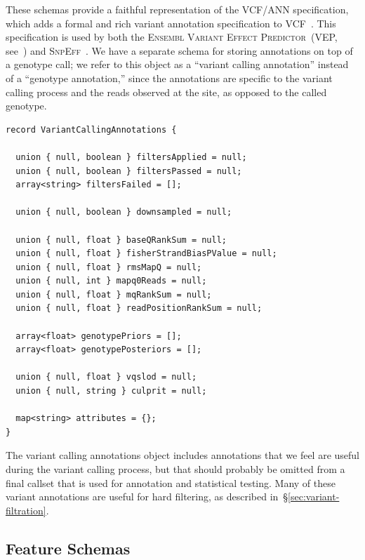 \documentclass[phd]{ucbthesis}
\begin{document}
These schemas provide a faithful representation of the VCF/ANN specification,
which adds a formal and rich variant annotation specification to
VCF~\cite{ann}. This specification is used by both the \textsc{Ensembl Variant
  Effect Predictor}~(VEP, see~\cite{mclaren10}) and \textsc{SnpEff}~\cite{cingolani12}.
We have a separate schema for storing annotations on top of a genotype call; we
refer to this object as a ``variant calling annotation'' instead of a ``genotype
annotation,'' since the annotations are specific to the variant calling process
and the reads observed at the site, as opposed to the called genotype.

\begin{lstlisting}[caption=\textsc{ADAM} genotype annotation schema]
record VariantCallingAnnotations {

  union { null, boolean } filtersApplied = null;
  union { null, boolean } filtersPassed = null;
  array<string> filtersFailed = [];

  union { null, boolean } downsampled = null;

  union { null, float } baseQRankSum = null;
  union { null, float } fisherStrandBiasPValue = null;
  union { null, float } rmsMapQ = null;
  union { null, int } mapq0Reads = null;
  union { null, float } mqRankSum = null;
  union { null, float } readPositionRankSum = null;

  array<float> genotypePriors = [];
  array<float> genotypePosteriors = [];

  union { null, float } vqslod = null;
  union { null, string } culprit = null;

  map<string> attributes = {};
}
\end{lstlisting}

The variant calling annotations object includes annotations that we feel are
useful during the variant calling process, but that should probably be omitted
from a final callset that is used for annotation and statistical testing. Many
of these variant annotations are useful for hard filtering, as described
in~\S\ref{sec:variant-filtration}.

\subsection{Feature Schemas}
\label{sec:feature-schemas}
\end{document}
